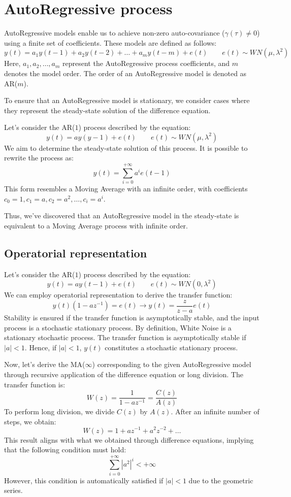 \section{AutoRegressive process}

AutoRegressive models enable us to achieve non-zero auto-covariance ($\gamma(\tau)\neq 0$) using a finite set of coefficients. 
These models are defined as follows:
\[y(t)=a_1y(t-1)+a_2y(t-2)+\dots+a_my(t-m)+e(t) \qquad e(t)\sim WN(\mu,\lambda^2)\]
Here, $a_1,a_2,\dots,a_m$ represent the AutoRegressive process coefficients, and $m$ denotes the model order. 
The order of an AutoRegressive model is denoted as AR($m$).

To ensure that an AutoRegressive model is stationary, we consider cases where they represent the steady-state solution of the difference equation.
\begin{example}
    Let's consider the AR($1$) process described by the equation:
    \[y(t)=ay(y-1)+e(t)\qquad e(t) \sim WN(\mu,\lambda^2)\]
    We aim to determine the steady-state solution of this process. 
    It is possible to rewrite the process as:
    \[y(t)=\sum_{i=0}^{+\infty}a^ie(t-1)\]
    This form resembles a Moving Average with an infinite order, with coefficients  $c_0=1,c_1=a,c_2=a^2,\dots,c_i=a^i$. 
\end{example}
Thus, we've discovered that an AutoRegressive model in the steady-state is equivalent to a Moving Average process with infinite order.

\subsection{Operatorial representation}
Let's consider the AR($1$) process described by the equation:
\[y(t)=ay(t-1)+e(t) \qquad e(t)\sim WN(0,\lambda^2)\]
We can employ operatorial representation to derive the transfer function:
\[y(t)\left( 1 -az^{-1} \right)=e(t) \rightarrow y(t)=\dfrac{z}{z-a}e(t)\]
Stability is ensured if the transfer function is asymptotically stable, and the input process is a stochastic stationary process.
By definition, White Noise is a stationary stochastic process. 
The transfer function is asymptotically stable if $\left\lvert a \right\rvert<1$.
Hence, if $\left\lvert a \right\rvert<1$, $y(t)$ constitutes a stochastic stationary process.

Now, let's derive the MA($\infty$) corresponding to the given AutoRegressive model through recursive application of the difference equation or long division. 
The transfer function is:
\[W(z)=\dfrac{1}{1-az^{-1}}=\dfrac{C(z)}{A(z)}\]
To perform long division, we divide $C(z)$ by $A(z)$. 
After an infinite number of steps, we obtain:
\[W(z)=1+az^{-1}+a^2z^{-2}+\dots\]
This result aligns with what we obtained through difference equations, implying that the following condition must hold:
\[\sum_{i=0}^{+\infty} \left\lvert a^2 \right\rvert^i<+\infty \]
However, this condition is automatically satisfied if $\left\lvert a \right\rvert<1$ due to the geometric series.

